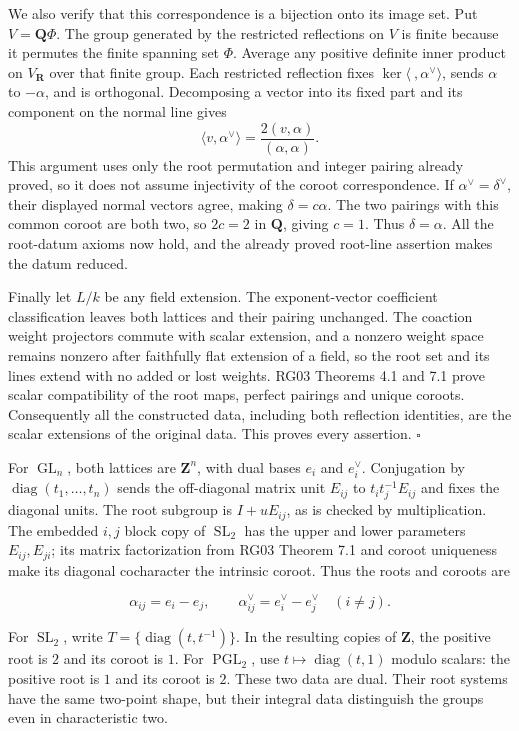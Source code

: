 \documentclass[11pt,a4paper,openany]{report}
\begin{document}
We also verify that this correspondence is a bijection onto its image set. Put \(V=\mathbf Q\Phi\). The group generated by the restricted reflections on \(V\) is finite because it permutes the finite spanning set \(\Phi\). Average any positive definite inner product on \(V_\mathbf R\) over that finite group. Each restricted reflection fixes \(\ker\langle\ ,\alpha^\vee\rangle\), sends \(\alpha\) to \(-\alpha\), and is orthogonal. Decomposing a vector into its fixed part and its component on the normal line gives \[
 \langle v,\alpha^\vee\rangle
       =\frac{2(v,\alpha)}{(\alpha,\alpha)}.
\] This argument uses only the root permutation and integer pairing already proved, so it does not assume injectivity of the coroot correspondence. If \(\alpha^\vee=\delta^\vee\), their displayed normal vectors agree, making \(\delta=c\alpha\). The two pairings with this common coroot are both two, so \(2c=2\) in \(\mathbf Q\), giving \(c=1\). Thus \(\delta=\alpha\). All the root-datum axioms now hold, and the already proved root-line assertion makes the datum reduced.

Finally let \(L/k\) be any field extension. The exponent-vector coefficient classification leaves both lattices and their pairing unchanged. The coaction weight projectors commute with scalar extension, and a nonzero weight space remains nonzero after faithfully flat extension of a field, so the root set and its lines extend with no added or lost weights. RG03 Theorems 4.1 and 7.1 prove scalar compatibility of the root maps, perfect pairings and unique coroots. Consequently all the constructed data, including both reflection identities, are the scalar extensions of the original data. This proves every assertion. \(\square\)

For \(\operatorname{GL}_n\), both lattices are \(\mathbf Z^n\), with dual bases \(e_i\) and \(e_i^\vee\). Conjugation by \(\operatorname{diag}(t_1,\ldots,t_n)\) sends the off-diagonal matrix unit \(E_{ij}\) to \(t_it_j^{-1}E_{ij}\) and fixes the diagonal units. The root subgroup is \(I+uE_{ij}\), as is checked by multiplication. The embedded \(i,j\) block copy of \(\operatorname{SL}_2\) has the upper and lower parameters \(E_{ij},E_{ji}\); its matrix factorization from RG03 Theorem 7.1 and coroot uniqueness make its diagonal cocharacter the intrinsic coroot. Thus the roots and coroots are

\[
\alpha_{ij}=e_i-e_j,\qquad
\alpha_{ij}^\vee=e_i^\vee-e_j^\vee\quad(i\ne j).
\tag{2.3}
\]

For \(\operatorname{SL}_2\), write \(T=\{\operatorname{diag}(t,t^{-1})\}\). In the resulting copies of \(\mathbf Z\), the positive root is \(2\) and its coroot is \(1\). For \(\operatorname{PGL}_2\), use \(t\mapsto\operatorname{diag}(t,1)\) modulo scalars: the positive root is \(1\) and its coroot is \(2\). These two data are dual. Their root systems have the same two-point shape, but their integral data distinguish the groups even in characteristic two.
\end{document}
